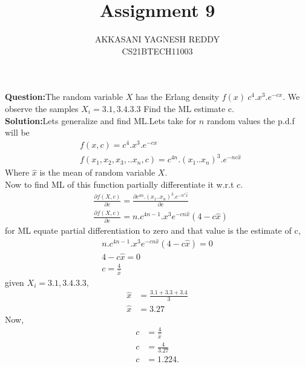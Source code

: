 \documentclass[journal,12pt,twocolumn]{IEEEtran}
\title{Assignment 9}
\author{AKKASANI YAGNESH REDDY \\
     CS21BTECH11003 \\}
\begin{document}
     \maketitle
     \textbf{Question:}The random variable $X$ has the Erlang density $f(x)~c^{4}.x^{3}.e^{-cx}$. We observe the samples $X_{i} = 3.1, 3.4.3.3$ Find the ML estimate c.\\
     \textbf{Solution:}Lets generalize and find ML.Lets take for $n$
     random values the p.d.f will be
     \begin{align}
         &f(x,c)=c^{4}.x^{3}.e^{-cx}\\
         &f(x_{1},x_{2},x_{3},..x_{n},c)=c^{4n}.(x_{1}..x_{n})^{3}.e^{-nc\hat{x}}
         \end{align}
         Where $\hat{x}$ is the mean of random variable $X$.\\
         Now to find ML of this function partially differentiate it w.r.t $c$.
         \begin{align}
             &\frac{\partial f(X,c)}{\partial c}=\frac{\partial c^{4n}.(x_{1}..x_{n})^{3}.e^{-n^c\hat{x}}}{\partial c}\\
             &\frac{\partial f(X,c)}{\partial c}=n.c^{4n-1}.x^{3}e^{-cn\hat{x}}(4-c\hat{x})
         \end{align}
         for ML equate partial differentiation to zero and that value is the estimate of c,
         \begin{align}
             n.c^{4n-1}.x^{3}e^{-cn\hat{x}}(4-c\hat{x})=0\\
             4-c\hat{x}=0\\
             c=\frac{4}{\hat{x}}
         \end{align}
         given $X_{i} = 3.1, 3.4.3.3,$
         \begin{align}
              \hat{x}&=\frac{3.1+3.3+3.4}{3}\\
              \hat{x}&=3.27
         \end{align}
         Now,
         \begin{align}
         c&=\frac{4}{\hat{x}}\\
         c&=\frac{4}{3.27}\\
         c&=1.224.
         \end{align}
     
\end{document}
